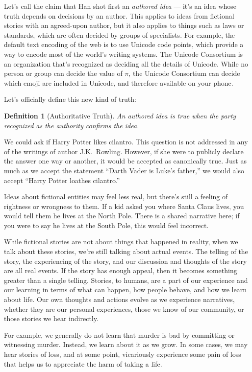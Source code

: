 \documentclass[11pt, oneside]{article}
\newtheorem*{defn}{Definition}
\theoremstyle{argtstyle}
\begin{document}
Let's call the claim that Han shot first
an {\em authored idea} --- it's an idea whose
truth depends on decisions by an author.
This applies to ideas from fictional stories with an agreed-upon
author, but it also applies to things such as laws or standards, which are often
decided by groups of specialists. For example, the default text encoding of the
web is to use Unicode code points, which provide a way to encode most of the
world's writing systems. The Unicode Consortium is an organization that's
recognized as deciding all the details of Unicode.
While no person or group can decide the value of $\pi$, the Unicode Consortium
can decide which emoji are included in Unicode, and therefore available on your
phone.

Let's officially define this new kind of truth:
\begin{defn}[Authoritative Truth]
    An authored idea is true when the party recognized as the authority confirms
    the idea.
\end{defn}

We could ask if Harry Potter likes cilantro. This question is not addressed in
any of the writings of author J.K.~Rowling. However, if she were to publicly
declare the answer one way or another, it would be accepted as canonically true.
Just as much as we accept the statement ``Darth Vader is Luke's father,'' we
would also accept ``Harry Potter loathes cilantro.''

Ideas about fictional entities may feel less real,
but there's still a feeling of rightness or wrongness to them.
If a kid asked you where Santa Claus lives, you would tell them he
lives at the North Pole. There is a shared narrative here; if you were to say he
lives at the South Pole, this would feel incorrect.

While fictional stories are not about things that happened in reality, when we
talk about these stories, we're still talking about actual events. The telling
of the story,
the experiencing of the story, and our discussion and thoughts of the
story are all real events.
If the story has enough appeal,
then it becomes something greater than a single telling.
Stories,
to humans, are a part of our experience and our learning in terms of what can
happen, how people behave, and how we learn about life. Our own thoughts and
actions evolve as we experience narratives, whether they are our personal
experiences, those we know of our community, or those stories we hear
indirectly.

For example, we generally do not learn that murder is bad by committing or
witnessing murder. Instead, we learn about it as we grow. In some cases, we may
hear stories of loss, and at some point, vicariously experience some pain of
loss that helps us to appreciate the harm of taking a life.
\end{document}
